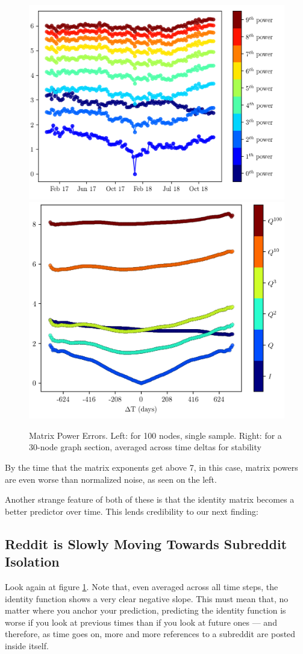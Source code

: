 \documentclass{article}
\theoremstyle{definition}
\begin{document}
	\begin{figure}[h!]
		\centering
		\includegraphics[width=0.52\linewidth]{figs/t_vs_err/Q_powers_halfway_all_cropped.png}
		\includegraphics[width=0.47\linewidth]{figs/dt_vs_err/Q_powers_no_conv.png}
		\caption{\color{darkgray} Matrix Power Errors. Left: for 100 nodes, single sample. Right: for a 30-node graph section, averaged across time deltas for stability} \label{fig:matrix_powers}
	\end{figure}

	
	
	By the time that the matrix exponents get above 7, in this case, matrix powers are even worse than normalized noise, as seen on the left.
	

	Another strange feature of both of these is that the identity matrix becomes a better predictor over time. This lends credibility to our next finding:
	
	
	\subsection{Reddit is Slowly Moving Towards Subreddit Isolation}
	
	Look again at figure \ref{fig:matrix_powers}. Note that, even averaged across all time steps, the identity function shows a very clear negative slope. This must mean that, no matter where you anchor your prediction, predicting the identity function is worse if you look at previous times than if you look at future ones --- and therefore, as time goes on, more and more references to a subreddit are posted inside itself.
	
\end{document}
